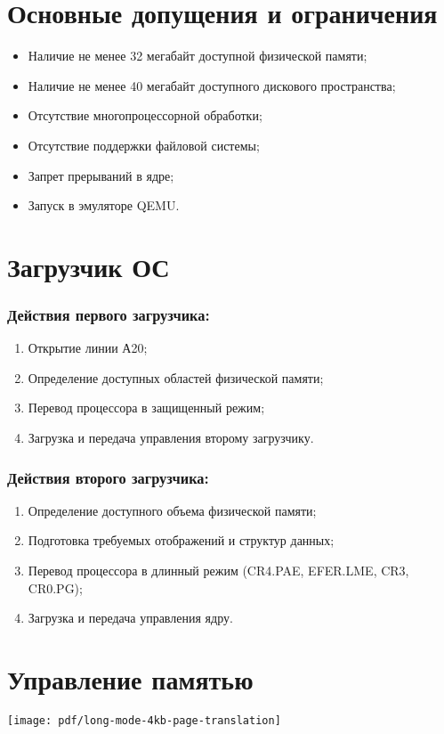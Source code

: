 \documentclass[12pt]{article}
\begin{document}
\section{\textbf{Основные допущения и ограничения}}
\begin{itemize}
\item Наличие не менее 32 мегабайт доступной физической памяти;
\item Наличие не менее 40 мегабайт доступного дискового пространства;
\item Отсутствие многопроцессорной обработки;
\item Отсутствие поддержки файловой системы;
\item Запрет прерываний в ядре;
\item Запуск в эмуляторе QEMU.
\end{itemize}


\section{\textbf{Загрузчик ОС}}
\subsubsection{Действия первого загрузчика:}
\begin{enumerate}
\item Открытие линии А20;
\item Определение доступных областей физической памяти;
\item Перевод процессора в защищенный режим;
\item Загрузка и передача управления второму загрузчику.
\end{enumerate}

\subsubsection{Действия второго загрузчика:}
\begin{enumerate}
\item Определение доступного объема физической памяти;
\item Подготовка требуемых отображений и структур данных;
\item Перевод процессора в длинный режим (CR4.PAE, EFER.LME, CR3, CR0.PG);
\item Загрузка и передача управления ядру.
\end{enumerate}


\section{\textbf{Управление памятью}}
\texttt{[image: pdf/long-mode-4kb-page-translation]}
\end{document}
